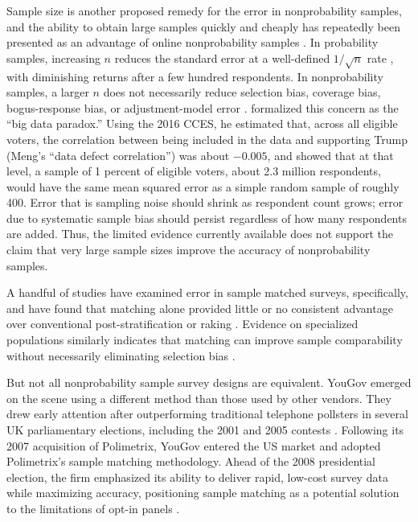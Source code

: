 \documentclass[12pt]{article}
\begin{document}
Sample size is another proposed remedy for the error in nonprobability samples, and the ability to obtain large samples quickly and cheaply has repeatedly been presented as an advantage of online nonprobability samples \parencites[24]{yougov_annual_2012}[12]{baker_report_2013}. In probability samples, increasing $n$ reduces the standard error at a well-defined $1/\sqrt{n}$ rate \parencite{cochran_sampling_1977}, with diminishing returns after a few hundred respondents. In nonprobability samples, a larger $n$ does not necessarily reduce selection bias, coverage bias, bogus-response bias, or adjustment-model error \parencite{elliott_inference_2017, mercer_theory_2017}. \textcite{meng_statistical_2018} formalized this concern as the ``big data paradox.'' Using the 2016 CCES, he estimated that, across all eligible voters, the correlation between being included in the data and supporting Trump (Meng's ``data defect correlation'') was about $-0.005$, and showed that at that level, a sample of 1 percent of eligible voters, about 2.3 million respondents, would have the same mean squared error as a simple random sample of roughly 400. Error that is sampling noise should shrink as respondent count grows; error due to systematic sample bias should persist regardless of how many respondents are added. Thus, the limited evidence currently available does not support the claim that very large sample sizes improve the accuracy of nonprobability samples. 

A handful of studies have examined error in sample matched surveys, specifically, and have found that matching alone provided little or no consistent advantage over conventional post-stratification or raking \parencite{brick_weighting_2015, buskirk_probability_2015, mercer_for_2018}. Evidence on specialized populations similarly indicates that matching can improve sample comparability without necessarily eliminating selection bias \parencite{disogra_matching_2015}.

But not all nonprobability sample survey designs are equivalent. YouGov emerged on the scene using a different method than those used by other vendors. They drew early attention after outperforming traditional telephone pollsters in several UK parliamentary elections, including the 2001 and 2005 contests \parencite{coleman_online_2001, electoralcalculus_2005}. Following its 2007 acquisition of Polimetrix, YouGov entered the US market and adopted Polimetrix’s sample matching methodology. Ahead of the 2008 presidential election, the firm emphasized its ability to deliver rapid, low-cost survey data while maximizing accuracy, positioning sample matching as a potential solution to the limitations of opt-in panels \parencite{crampton_about_2007, bradshaw_yougov_2008}. 
\end{document}
